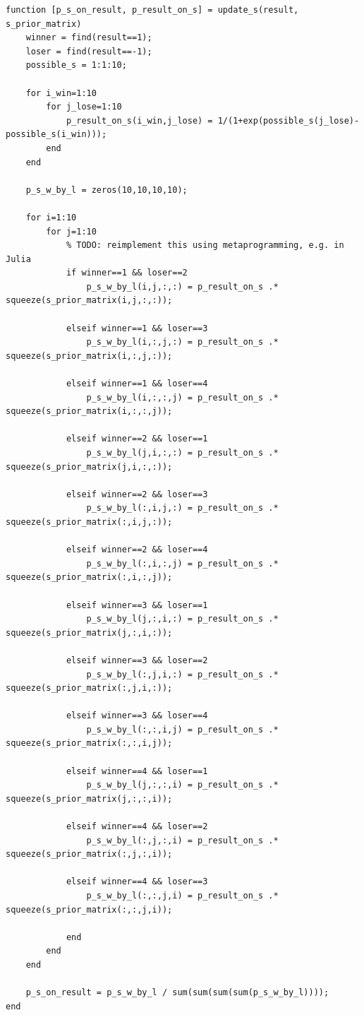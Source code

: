 \documentclass[11pt,a4paper,oneside]{report}
\begin{document}
\begin{lstlisting}
function [p_s_on_result, p_result_on_s] = update_s(result, s_prior_matrix)
    winner = find(result==1);
    loser = find(result==-1);
    possible_s = 1:1:10;

    for i_win=1:10
        for j_lose=1:10
            p_result_on_s(i_win,j_lose) = 1/(1+exp(possible_s(j_lose)-possible_s(i_win)));
        end
    end
    
    p_s_w_by_l = zeros(10,10,10,10);
    
    for i=1:10
        for j=1:10
            % TODO: reimplement this using metaprogramming, e.g. in Julia
            if winner==1 && loser==2
                p_s_w_by_l(i,j,:,:) = p_result_on_s .* squeeze(s_prior_matrix(i,j,:,:));

            elseif winner==1 && loser==3
                p_s_w_by_l(i,:,j,:) = p_result_on_s .* squeeze(s_prior_matrix(i,:,j,:));
                
            elseif winner==1 && loser==4
                p_s_w_by_l(i,:,:,j) = p_result_on_s .* squeeze(s_prior_matrix(i,:,:,j));
                
            elseif winner==2 && loser==1
                p_s_w_by_l(j,i,:,:) = p_result_on_s .* squeeze(s_prior_matrix(j,i,:,:));
                
            elseif winner==2 && loser==3
                p_s_w_by_l(:,i,j,:) = p_result_on_s .* squeeze(s_prior_matrix(:,i,j,:));
                
            elseif winner==2 && loser==4
                p_s_w_by_l(:,i,:,j) = p_result_on_s .* squeeze(s_prior_matrix(:,i,:,j));
                
            elseif winner==3 && loser==1
                p_s_w_by_l(j,:,i,:) = p_result_on_s .* squeeze(s_prior_matrix(j,:,i,:));
                
            elseif winner==3 && loser==2
                p_s_w_by_l(:,j,i,:) = p_result_on_s .* squeeze(s_prior_matrix(:,j,i,:));
                
            elseif winner==3 && loser==4
                p_s_w_by_l(:,:,i,j) = p_result_on_s .* squeeze(s_prior_matrix(:,:,i,j));
                
            elseif winner==4 && loser==1
                p_s_w_by_l(j,:,:,i) = p_result_on_s .* squeeze(s_prior_matrix(j,:,:,i));
                
            elseif winner==4 && loser==2
                p_s_w_by_l(:,j,:,i) = p_result_on_s .* squeeze(s_prior_matrix(:,j,:,i));
                
            elseif winner==4 && loser==3
                p_s_w_by_l(:,:,j,i) = p_result_on_s .* squeeze(s_prior_matrix(:,:,j,i));
                
            end
        end
    end
    
    p_s_on_result = p_s_w_by_l / sum(sum(sum(sum(p_s_w_by_l))));
end

\end{lstlisting}
\end{document}
